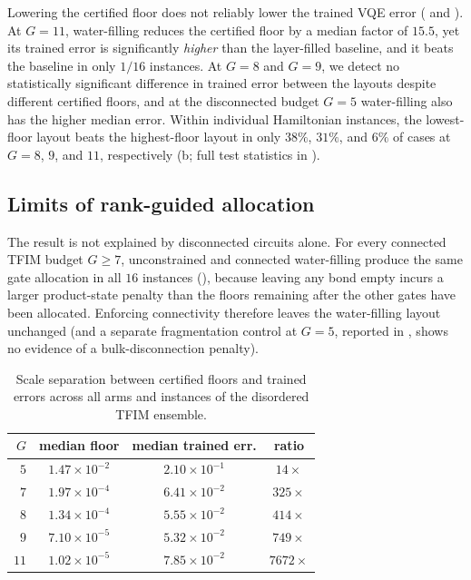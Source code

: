 \documentclass[reprint,aps,pra,floatfix,superscriptaddress,nofootinbib,longbibliography]{revtex4-2}
\theoremstyle{remark}
\theoremstyle{definition}
\begin{document}
Lowering the certified floor does not reliably lower the trained VQE error
( and ). At $G=11$,
water-filling reduces the certified floor by a median factor of $15.5$, yet its
trained error is significantly \emph{higher} than the layer-filled baseline, and
it beats the baseline in only $1/16$ instances. At $G=8$ and $G=9$, we detect no statistically significant difference in
trained error between the layouts despite different certified floors, and at the disconnected budget $G=5$ water-filling also has the higher
median error. Within individual Hamiltonian instances, the lowest-floor layout beats the
highest-floor layout in only $38\%$, $31\%$, and $6\%$ of cases at $G=8$, $9$,
and $11$, respectively (b; full test statistics in
).

\subsection{Limits of rank-guided allocation}

The result is not explained by disconnected circuits alone. For every
connected TFIM budget $G\ge7$, unconstrained and connected water-filling produce
the same gate allocation in all $16$ instances (), because
leaving any bond empty incurs a larger product-state penalty than the floors remaining after the other gates have been allocated. Enforcing connectivity therefore leaves the water-filling
layout unchanged (and a separate fragmentation control at $G=5$, reported in
, shows no evidence of a bulk-disconnection penalty).

\begin{table}[t]
\centering
\caption{Scale separation between certified floors and trained errors across all
arms and instances of the disordered TFIM ensemble.}
\label{tab:active}
{\small\setlength{\tabcolsep}{5pt}
\begin{tabular}{rccc}
\toprule
$G$ & median floor & median trained err. & ratio\\
\midrule
$5$  & $1.47\times10^{-2}$ & $2.10\times10^{-1}$ & $14\times$\\
$7$  & $1.97\times10^{-4}$ & $6.41\times10^{-2}$ & $325\times$\\
$8$  & $1.34\times10^{-4}$ & $5.55\times10^{-2}$ & $414\times$\\
$9$  & $7.10\times10^{-5}$ & $5.32\times10^{-2}$ & $749\times$\\
$11$ & $1.02\times10^{-5}$ & $7.85\times10^{-2}$ & $7672\times$\\
\bottomrule
\end{tabular}}
\end{table}
\end{document}
